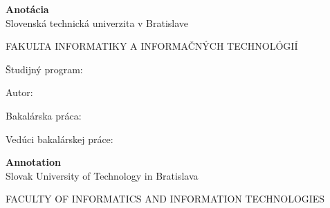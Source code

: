 \newpage
\thispagestyle{plain}

\noindent
{\huge\bf Anotácia}\\[\baselineskip]
\noindent 
{Slovenská technická univerzita v Bratislave}

\vspace*{.2cm}
\noindent
FAKULTA INFORMATIKY A INFORMAČNÝCH TECHNOLÓGIÍ

\vspace*{.2cm}
\noindent
Študijný program: \hspace*{1.9cm} \Programsk

\vspace*{.7cm}
\noindent
Autor: \hspace*{3.9cm} \Author

\vspace*{.2cm}
\noindent
Bakalárska práca:\hspace*{2.2cm}\Titlesk

\vspace*{.2cm}
\noindent
Vedúci bakalárskej práce:\hspace*{.9cm}\Supervisor

\vspace*{.2cm}
\noindent
\Monthsk \Year
\noindent

\vspace*{2cm}
\noindent
\lipsum[1]
\newpage\null\thispagestyle{empty}\newpage


\thispagestyle{plain}

\noindent
{\huge \bf Annotation}\\[\baselineskip]
\noindent
\noindent 
{Slovak University of Technology in Bratislava}

\vspace*{.2cm}
\noindent
\uppercase{Faculty of Informatics and Information Technologies}

